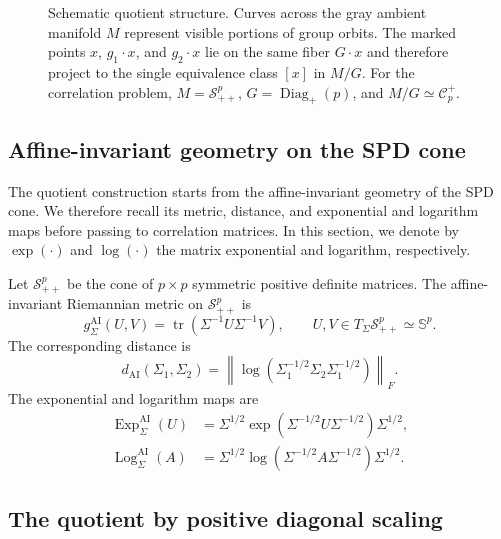 \documentclass[
  12pt]{article}
\newcommand{\SPD}{\mathcal S_{++}}
\newcommand{\Sym}{\mathbb S}
\newcommand{\Corr}{\mathcal C^+}
\newcommand{\Diagp}{\operatorname{Diag}_{+}}
\newcommand{\tr}{\operatorname{tr}}
\newcommand{\Log}{\operatorname{Log}}
\newcommand{\Exp}{\operatorname{Exp}}
\newcommand{\AI}{\mathrm{AI}}
\begin{document}
\begin{figure}[H]
{%
}
\caption{Schematic quotient structure. Curves across the gray ambient manifold $M$ represent visible portions of group orbits. The marked points $x$, $g_1\!\cdot\!x$, and $g_2\!\cdot\!x$ lie on the same fiber $G\!\cdot\!x$ and therefore project to the single equivalence class $[x]$ in $M/G$. For the correlation problem, $M=\SPD^p$, $G=\Diagp(p)$, and $M/G\simeq\Corr_p$.}
\label{fig:quotient_schematic}
\end{figure}



\subsection{Affine-invariant geometry on the SPD cone}

The quotient construction starts from the affine-invariant geometry of the SPD cone. We therefore recall its metric, distance, and exponential and logarithm maps before passing to correlation matrices. In this section, we denote by $\exp(\cdot)$ and $\log(\cdot)$ the matrix exponential and logarithm, respectively.

Let $\SPD^p$ be the cone of $p\times p$ symmetric positive definite matrices. The affine-invariant Riemannian metric on $\SPD^p$ is
\[
g^{\AI}_{\Sigma}(U,V)=\tr(\Sigma^{-1}U\Sigma^{-1}V),
\qquad U,V\in T_{\Sigma}\SPD^p\simeq \Sym^p.
\]
The corresponding distance is
\[
d_{\AI}(\Sigma_1,\Sigma_2)=\left\|\log\left(\Sigma_1^{-1/2}\Sigma_2\Sigma_1^{-1/2}\right)\right\|_F.
\]
The exponential and logarithm maps are
\begin{align*}
\Exp^{\AI}_{\Sigma}(U)&=\Sigma^{1/2}\exp\left(\Sigma^{-1/2}U\Sigma^{-1/2}\right)\Sigma^{1/2},\\
\Log^{\AI}_{\Sigma}(A)&=\Sigma^{1/2}\log\left(\Sigma^{-1/2}A\Sigma^{-1/2}\right)\Sigma^{1/2}.
\end{align*}

\subsection{The quotient by positive diagonal scaling}
\end{document}
